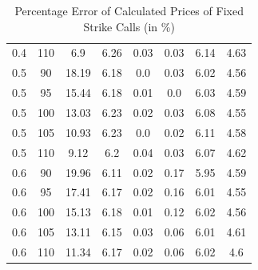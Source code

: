 \documentclass{article}
\begin{document}
\begin{table}[H]
\begin{tabular}{|c|c|c|c|c|c|c|c|}
  0.4 & 110 & 6.9 & 6.26 & 0.03 & 0.03 & 6.14 & 4.63 \\
  0.5 & 90 & 18.19 & 6.18 & 0.0 & 0.03 & 6.02 & 4.56 \\
  0.5 & 95 & 15.44 & 6.18 & 0.01 & 0.0 & 6.03 & 4.59 \\
  0.5 & 100 & 13.03 & 6.23 & 0.02 & 0.03 & 6.08 & 4.55 \\
  0.5 & 105 & 10.93 & 6.23 & 0.0 & 0.02 & 6.11 & 4.58 \\
  0.5 & 110 & 9.12 & 6.2 & 0.04 & 0.03 & 6.07 & 4.62 \\
  0.6 & 90 & 19.96 & 6.11 & 0.02 & 0.17 & 5.95 & 4.59 \\
  0.6 & 95 & 17.41 & 6.17 & 0.02 & 0.16 & 6.01 & 4.55 \\
  0.6 & 100 & 15.13 & 6.18 & 0.01 & 0.12 & 6.02 & 4.56 \\
  0.6 & 105 & 13.11 & 6.15 & 0.03 & 0.06 & 6.01 & 4.61 \\
  0.6 & 110 & 11.34 & 6.17 & 0.02 & 0.06 & 6.02 & 4.6 \\
  \hline
  \end{tabular}
  \caption{Percentage Error of Calculated Prices of Fixed Strike Calls (in \%)}
  \label{table:name}
\end{table}
\end{document}
